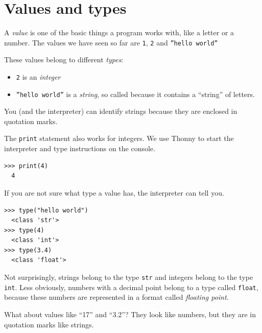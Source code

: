 \hypertarget{valores-y-tipos}{%
\section{Values and types}\label{valores-y-tipos}}

  

A \emph{value} is one of the basic things a program works
with, like a letter or a number. The values we have seen so far are \texttt{1}, \texttt{2} and \texttt{''hello world''}

These values belong to different \emph{types}:

\begin{itemize}[nosep]
    \item \texttt{2} is an \emph{integer}
    \item \texttt{''hello world''} is a \emph{string}, so called because it contains a ``string'' of letters.
\end{itemize}

You (and the interpreter) can identify strings because they are enclosed in quotation marks.


The \texttt{print} statement also works for integers. We use
Thonny to start the interpreter and type instructions on the console.

\begin{Verbatim}[frame=single]
>>> print(4)
  4
\end{Verbatim}

If you are not sure what type a value has, the interpreter can tell you.

\begin{Verbatim}[frame=single]
>>> type("hello world")
  <class 'str'>
>>> type(4)
  <class 'int'>
>>> type(3.4)
  <class 'float'>
\end{Verbatim}


Not surprisingly, strings belong to the type \texttt{str} and integers
belong to the type \texttt{int}. Less obviously, numbers with a decimal
point belong to a type called \texttt{float}, because these numbers are
represented in a format called \emph{floating point}.

   
  


What about values like ``17'' and ``3.2''? They look like numbers, but they are in quotation marks like strings.

